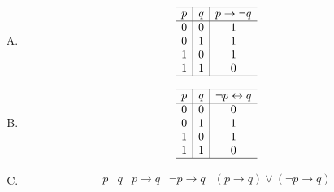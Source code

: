 {{        %
        \begin{practices}
            \begin{enumerate}[A.]
                \item 
                {
                    \begin{table}[H]
                        \[
                            \begin{array}{c|c|c}
                                \hline
                                p & q & p \rightarrow \neg q \\
                                \hline
                                0 & 0 & 1 \\
                                0 & 1 & 1 \\
                                1 & 0 & 1 \\
                                1 & 1 & 0 \\
                                \hline
                            \end{array}
                        \]
                    \end{table}
                }
                \item 
                {
                    \begin{table}[H]
                        \[
                            \begin{array}{c|c|c}
                                \hline
                                p & q & \neg p \leftrightarrow q \\
                                \hline
                                0 & 0 & 0 \\
                                0 & 1 & 1 \\
                                1 & 0 & 1 \\
                                1 & 1 & 0 \\
                                \hline
                            \end{array}
                        \]
                    \end{table}
                }
                \item
                {
                    \begin{table}[H]
                        \[
                            \begin{array}{c|c|c|c|c}
                                \hline
                                p & q & p \rightarrow q & \neg p \rightarrow q & (p \rightarrow q) \vee (\neg p \rightarrow q) \\

\end{array}\]
\end{table}}
\end{enumerate}
\end{practices}}}
